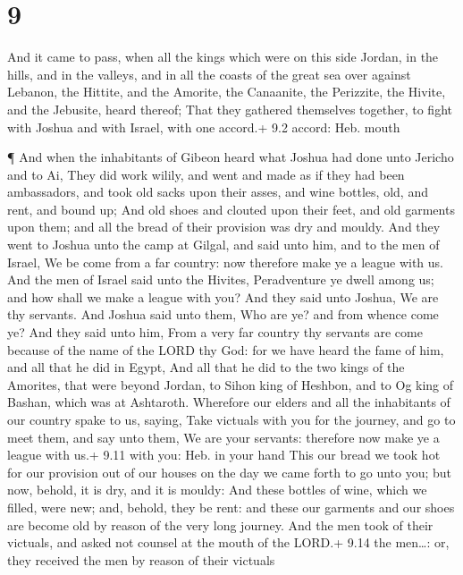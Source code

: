 \hypertarget{section-8}{%
\section{9}\label{section-8}}

 And it came to pass, when all the kings which were on this
side Jordan, in the hills, and in the valleys, and in all the coasts of
the great sea over against Lebanon, the Hittite, and the Amorite, the
Canaanite, the Perizzite, the Hivite, and the Jebusite, heard thereof;
 That they gathered themselves together, to fight with
Joshua and with Israel, with one accord.+ 9.2 accord: Heb. mouth

 ¶ And when the inhabitants of Gibeon heard what Joshua had
done unto Jericho and to Ai,  They did work wilily, and went
and made as if they had been ambassadors, and took old sacks upon their
asses, and wine bottles, old, and rent, and bound up;  And
old shoes and clouted upon their feet, and old garments upon them; and
all the bread of their provision was dry and mouldy.  And
they went to Joshua unto the camp at Gilgal, and said unto him, and to
the men of Israel, We be come from a far country: now therefore make ye
a league with us.  And the men of Israel said unto the
Hivites, Peradventure ye dwell among us; and how shall we make a league
with you?  And they said unto Joshua, We are thy servants.
And Joshua said unto them, Who are ye? and from whence come ye?
 And they said unto him, From a very far country thy
servants are come because of the name of the LORD thy God: for we have
heard the fame of him, and all that he did in Egypt,  And
all that he did to the two kings of the Amorites, that were beyond
Jordan, to Sihon king of Heshbon, and to Og king of Bashan, which was at
Ashtaroth.  Wherefore our elders and all the inhabitants of
our country spake to us, saying, Take victuals with you for the journey,
and go to meet them, and say unto them, We are your servants: therefore
now make ye a league with us.+ 9.11 with you: Heb. in your hand
 This our bread we took hot for our provision out of our
houses on the day we came forth to go unto you; but now, behold, it is
dry, and it is mouldy:  And these bottles of wine, which we
filled, were new; and, behold, they be rent: and these our garments and
our shoes are become old by reason of the very long journey.
 And the men took of their victuals, and asked not counsel
at the mouth of the LORD.+ 9.14 the men\ldots: or, they received the men
by reason of their victuals

